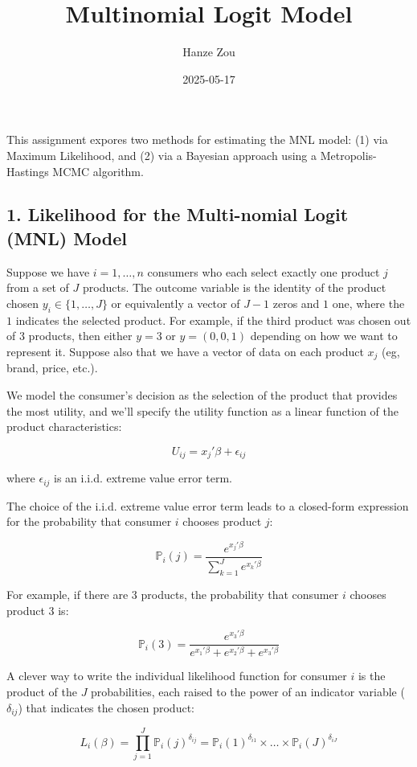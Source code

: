 \documentclass[
  letterpaper,
  DIV=11,
  numbers=noendperiod]{scrartcl}
\title{Multinomial Logit Model}
\author{Hanze Zou}
\date{2025-05-17}
\begin{document}
\maketitle


This assignment expores two methods for estimating the MNL model: (1)
via Maximum Likelihood, and (2) via a Bayesian approach using a
Metropolis-Hastings MCMC algorithm.

\subsection{1. Likelihood for the Multi-nomial Logit (MNL)
Model}\label{likelihood-for-the-multi-nomial-logit-mnl-model}

Suppose we have \(i=1,\ldots,n\) consumers who each select exactly one
product \(j\) from a set of \(J\) products. The outcome variable is the
identity of the product chosen \(y_i \in \{1, \ldots, J\}\) or
equivalently a vector of \(J-1\) zeros and \(1\) one, where the \(1\)
indicates the selected product. For example, if the third product was
chosen out of 3 products, then either \(y=3\) or \(y=(0,0,1)\) depending
on how we want to represent it. Suppose also that we have a vector of
data on each product \(x_j\) (eg, brand, price, etc.).

We model the consumer's decision as the selection of the product that
provides the most utility, and we'll specify the utility function as a
linear function of the product characteristics:

\[ U_{ij} = x_j'\beta + \epsilon_{ij} \]

where \(\epsilon_{ij}\) is an i.i.d. extreme value error term.

The choice of the i.i.d. extreme value error term leads to a closed-form
expression for the probability that consumer \(i\) chooses product
\(j\):

\[ \mathbb{P}_i(j) = \frac{e^{x_j'\beta}}{\sum_{k=1}^Je^{x_k'\beta}} \]

For example, if there are 3 products, the probability that consumer
\(i\) chooses product 3 is:

\[ \mathbb{P}_i(3) = \frac{e^{x_3'\beta}}{e^{x_1'\beta} + e^{x_2'\beta} + e^{x_3'\beta}} \]

A clever way to write the individual likelihood function for consumer
\(i\) is the product of the \(J\) probabilities, each raised to the
power of an indicator variable (\(\delta_{ij}\)) that indicates the
chosen product:

\[ L_i(\beta) = \prod_{j=1}^J \mathbb{P}_i(j)^{\delta_{ij}} = \mathbb{P}_i(1)^{\delta_{i1}} \times \ldots \times \mathbb{P}_i(J)^{\delta_{iJ}}\]
\end{document}
